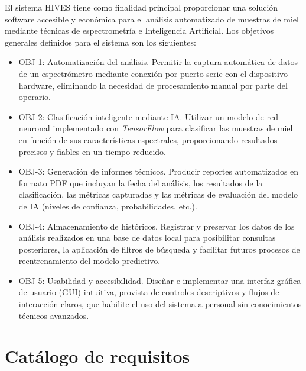 El sistema HIVES tiene como finalidad principal proporcionar una solución software accesible y económica para el análisis automatizado de muestras de miel mediante técnicas de espectrometría e Inteligencia Artificial. Los objetivos generales definidos para el sistema son los siguientes:
\begin{itemize}
\item OBJ-1: Automatización del análisis. Permitir la captura automática de datos de un espectrómetro mediante conexión por puerto serie con el dispositivo hardware, eliminando la necesidad de procesamiento manual por parte del operario.
\item OBJ-2: Clasificación inteligente mediante IA. Utilizar un modelo de red neuronal implementado con \textit{TensorFlow} para clasificar las muestras de miel en función de sus características espectrales, proporcionando resultados precisos y fiables en un tiempo reducido.
\item OBJ-3: Generación de informes técnicos. Producir reportes automatizados en formato PDF que incluyan la fecha del análisis, los resultados de la clasificación, las métricas capturadas y las métricas de evaluación del modelo de IA (niveles de confianza, probabilidades, etc.).
\item OBJ-4: Almacenamiento de históricos. Registrar y preservar los datos de los análisis realizados en una base de datos local para posibilitar consultas posteriores, la aplicación de filtros de búsqueda y facilitar futuros procesos de reentrenamiento del modelo predictivo.
\item OBJ-5: Usabilidad y accesibilidad. Diseñar e implementar una interfaz gráfica de usuario (GUI) intuitiva, provista de controles descriptivos y flujos de interacción claros, que habilite el uso del sistema a personal sin conocimientos técnicos avanzados.
\end{itemize}
\newpage
\section{Catálogo de requisitos}
